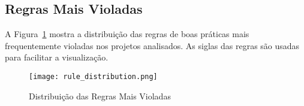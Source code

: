 \documentclass[12pt]{article}
\begin{document}
\subsection{Regras Mais Violadas}
A Figura~\ref{fig:rule_distribution} mostra a distribuição das regras de boas práticas mais frequentemente violadas nos projetos analisados. As siglas das regras são usadas para facilitar a visualização.

\begin{figure}[H]
\centering
\texttt{[image: rule\_distribution.png]}
\caption{Distribuição das Regras Mais Violadas}
\label{fig:rule_distribution}
\end{figure}

\end{document}

